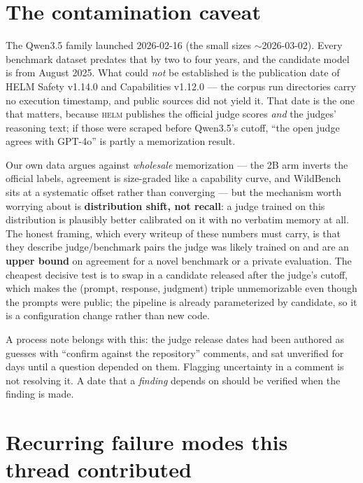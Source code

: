 \documentclass[11pt]{report}
\begin{document}
\section{The contamination caveat}
\label{sec:contamination}

The Qwen3.5 family launched 2026-02-16 (the small sizes $\sim$2026-03-02). Every
benchmark dataset predates that by two to four years, and the candidate model is from
August 2025. What could \emph{not} be established is the publication date of HELM
Safety v1.14.0 and Capabilities v1.12.0 --- the corpus run directories carry no
execution timestamp, and public sources did not yield it. That date is the one that
matters, because \textsc{helm} publishes the official judge scores \emph{and} the
judges' reasoning text; if those were scraped before Qwen3.5's cutoff, ``the open
judge agrees with GPT-4o'' is partly a memorization result.

Our own data argues against \emph{wholesale} memorization --- the 2B arm inverts the
official labels, agreement is size-graded like a capability curve, and WildBench sits
at a systematic offset rather than converging --- but the mechanism worth worrying
about is \textbf{distribution shift, not recall}: a judge trained on this
distribution is plausibly better calibrated on it with no verbatim memory at all.
The honest framing, which every writeup of these numbers must carry, is that they
describe judge/benchmark pairs the judge was likely trained on and are an
\textbf{upper bound} on agreement for a novel benchmark or a private evaluation. The
cheapest decisive test is to swap in a candidate released after the judge's cutoff,
which makes the (prompt, response, judgment) triple unmemorizable even though the
prompts were public; the pipeline is already parameterized by candidate, so it is a
configuration change rather than new code.

A process note belongs with this: the judge release dates had been authored as
guesses with ``confirm against the repository'' comments, and sat unverified for days
until a question depended on them. Flagging uncertainty in a comment is not
resolving it. A date that a \emph{finding} depends on should be verified when the
finding is made.

\section{Recurring failure modes this thread contributed}
\end{document}
